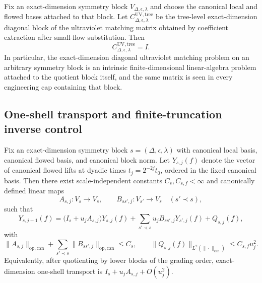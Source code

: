 
\begin{theorem}\label{thm:quotient-coefficient-extraction}
Fix an exact-dimension symmetry block $V_{\Delta,\epsilon,\lambda}$ and choose the canonical local and flowed bases attached to that block. Let $C^{\mathrm{UV,tree}}_{\Delta,\epsilon,\lambda}$ be the tree-level exact-dimension diagonal block of the ultraviolet matching matrix obtained by coefficient extraction after small-flow substitution. Then
\[
C^{\mathrm{UV,tree}}_{\Delta,\epsilon,\lambda}=I.
\]
In particular, the exact-dimension diagonal ultraviolet matching problem on an arbitrary symmetry block is an intrinsic finite-dimensional linear-algebra problem attached to the quotient block itself, and the same matrix is seen in every engineering cap containing that block.
\end{theorem}


\subsection{One-shell transport and finite-truncation inverse control}

\begin{theorem}\label{thm:one-shell-transport}
Fix an exact-dimension symmetry block $s=(\Delta,\epsilon,\lambda)$ with canonical local basis, canonical flowed basis, and canonical block norm. Let $Y_{s,j}(f)$ denote the vector of canonical flowed lifts at dyadic times $t_j=2^{-2j}t_0$, ordered in the fixed canonical basis. Then there exist scale-independent constants $C_s,C_{s,f}<\infty$ and canonically defined linear maps
\[
A_{s,j}:V_s\to V_s,\qquad B_{ss',j}:V_{s'}\to V_s\quad(s'\prec s),
\]
such that
\[
Y_{s,j+1}(f)=\bigl(I_s+u_jA_{s,j}\bigr)Y_{s,j}(f)+\sum_{s'\prec s}u_j B_{ss',j}Y_{s',j}(f)+Q_{s,j}(f),
\]
with
\[
\|A_{s,j}\|_{\mathrm{op,can}}+\sum_{s'\prec s}\|B_{ss',j}\|_{\mathrm{op,can}}\le C_s,
\qquad
\|Q_{s,j}(f)\|_{L^2(\|\cdot\|_{\mathrm{can}})}\le C_{s,f}u_j^2.
\]
Equivalently, after quotienting by lower blocks of the grading order, exact-dimension one-shell transport is $I_s+u_jA_{s,j}+O(u_j^2)$.
\end{theorem}

